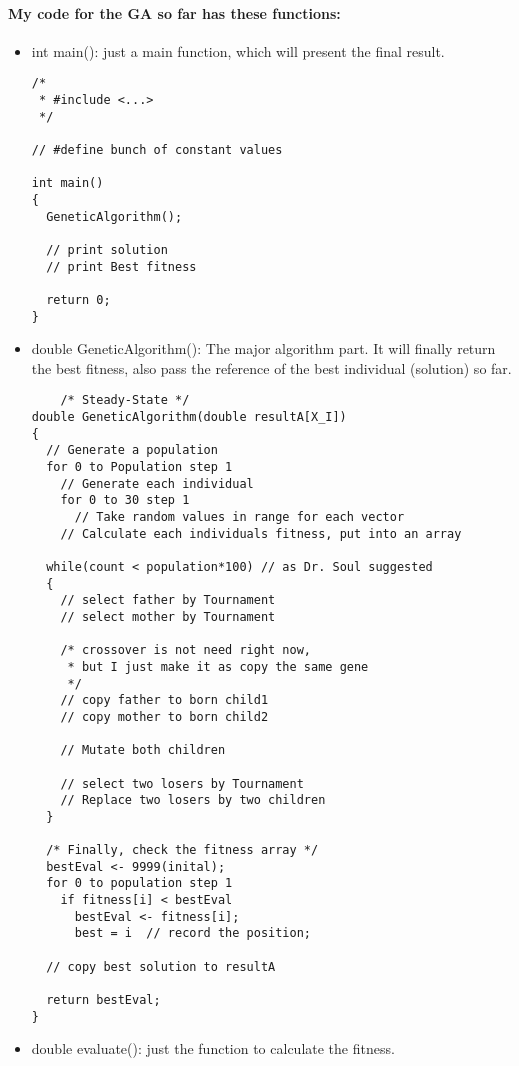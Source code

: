 \documentclass[12pt]{article}
\begin{document}
\paragraph{My code for the GA so far has these functions:}
\begin{itemize}
	\item int main(): just a main function, which will present the final result.
	\begin{lstlisting}
/*
 * #include <...>
 */

// #define bunch of constant values

int main()
{
  GeneticAlgorithm();
 
  // print solution
  // print Best fitness 
 
  return 0;
}
\end{lstlisting}

	\item double GeneticAlgorithm(): The major algorithm part. It will finally return the best fitness, also pass the reference of the best individual (solution) so far.
	\begin{lstlisting}
	/* Steady-State */
double GeneticAlgorithm(double resultA[X_I])
{
  // Generate a population
  for 0 to Population step 1
    // Generate each individual 
    for 0 to 30 step 1
      // Take random values in range for each vector
    // Calculate each individuals fitness, put into an array

  while(count < population*100) // as Dr. Soul suggested
  {
    // select father by Tournament
    // select mother by Tournament
  	
	/* crossover is not need right now, 
	 * but I just make it as copy the same gene
	 */
    // copy father to born child1
    // copy mother to born child2  
    
    // Mutate both children	
    
    // select two losers by Tournament
    // Replace two losers by two children
  }
  
  /* Finally, check the fitness array */
  bestEval <- 9999(inital);
  for 0 to population step 1
    if fitness[i] < bestEval
      bestEval <- fitness[i];
      best = i	// record the position;
      
  // copy best solution to resultA      
      
  return bestEval;
}
	\end{lstlisting}
	
	\item double evaluate(): just the function to calculate the fitness.
	

\end{itemize}
\end{document}
